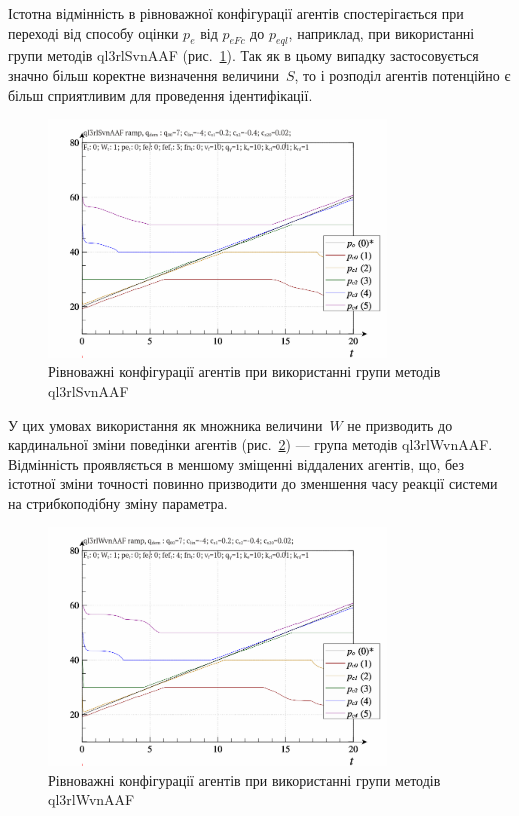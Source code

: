 Істотна відмінність в рівноважної конфігурації агентів
спостерігається при переході від способу оцінки
$p_e$ від
$p_{eFc}$ до
$p_{eql}$, наприклад, при використанні групи методів ql3rlSvnAAF
(рис.~\ref{atu:f:qls_ramp_ql3rlSvnAAF}). Так як в цьому випадку застосовується
значно більш коректне визначення величини~$S$,
то і розподіл агентів потенційно є більш сприятливим для
проведення ідентифікації.

\begin{figure}[htb!]
  \begin{center}
    \includegraphics[width=0.8\textwidth]{p/ramp/qls-p_t_pi_ql3rlSvnAAF_ramp.png}
  \end{center}
  \caption{Рівноважні конфігурації агентів при використанні групи методів ql3rlSvnAAF}
  \label{atu:f:qls_ramp_ql3rlSvnAAF}
\end{figure}


У цих умовах використання як множника величини~$W$
не призводить до кардинальної зміни поведінки агентів
(рис.~\ref{atu:f:qls_ramp_ql3rlWvnAAF}) --- група методів ql3rlWvnAAF.
Відмінність проявляється в меншому зміщенні віддалених агентів, що, без
істотної зміни точності повинно призводити до зменшення часу
реакції системи на стрибкоподібну зміну параметра.


\begin{figure}[htb!]
  \begin{center}
    \includegraphics[width=0.8\textwidth]{p/ramp/qls-p_t_pi_ql3rlWvnAAF_ramp.png}
  \end{center}
  \caption{Рівноважні конфігурації агентів при використанні групи методів ql3rlWvnAAF}
  \label{atu:f:qls_ramp_ql3rlWvnAAF}
\end{figure}

